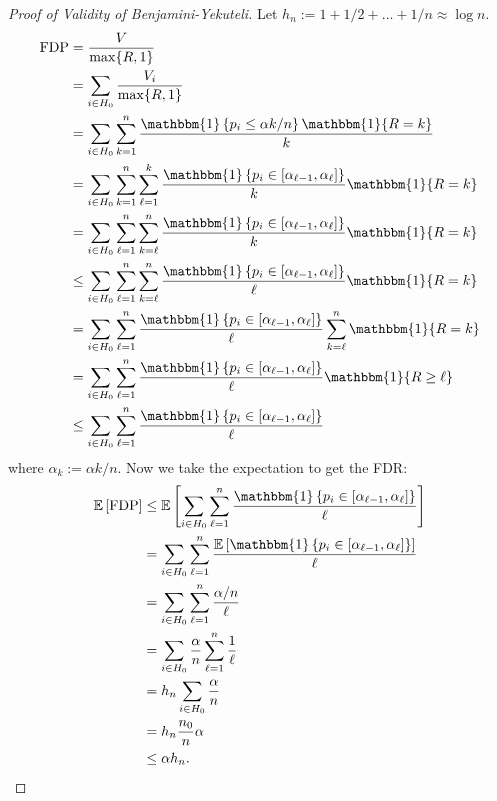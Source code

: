 \begin{proof}[Proof of Validity of Benjamini-Yekuteli]
Let \(h_n := 1 + 1/2 + \ldots + 1/n \approx \log n\).
\begin{align*}
\operatorname{FDP} & = \frac{V}{\max \{R, 1\}} 
\\ & = \sum_{i \in H_0} \frac{V_i}{\max \{R, 1\}} 
\\ & = \sum_{i \in H_0}  \sum_{k=1}^n \frac{\mathbbm{1} \left\{ p_i \leq \alpha k/n \right\}  \mathbbm{1}\{R = k\}}{k} 
\\ & = \sum_{i \in H_0}  \sum_{k=1}^n \sum_{\ell =1 }^k \frac{\mathbbm{1} \left\{ p_i \in [\alpha_{\ell - 1}, \alpha_\ell] \right\} }{k}  \mathbbm{1}\{R = k\}
\\ & = \sum_{i \in H_0}  \sum_{\ell =1 }^n \sum_{k=\ell}^n \frac{\mathbbm{1} \left\{ p_i \in [\alpha_{\ell - 1}, \alpha_\ell] \right\} }{k}  \mathbbm{1}\{R = k\}
\\ & \leq \sum_{i \in H_0}  \sum_{\ell =1 }^n \sum_{k=\ell}^n \frac{\mathbbm{1} \left\{ p_i \in [\alpha_{\ell - 1}, \alpha_\ell] \right\} }{\ell}  \mathbbm{1}\{R = k\}
\\ & = \sum_{i \in H_0}  \sum_{\ell =1 }^n  \frac{\mathbbm{1} \left\{ p_i \in [\alpha_{\ell - 1}, \alpha_\ell] \right\} }{\ell}  \sum_{k=\ell}^n \mathbbm{1}\{R = k\}
\\ & = \sum_{i \in H_0}  \sum_{\ell =1 }^n  \frac{\mathbbm{1} \left\{ p_i \in [\alpha_{\ell - 1}, \alpha_\ell] \right\} }{\ell}  \mathbbm{1}\{R \geq \ell \}
\\ & \leq  \sum_{i \in H_0}  \sum_{\ell =1 }^n  \frac{\mathbbm{1} \left\{ p_i \in [\alpha_{\ell - 1}, \alpha_\ell] \right\} }{\ell} 
\end{align*}
where \(\alpha_k := \alpha k/n\). Now we take the expectation to get the FDR:
\begin{align*}
\E \left[ \operatorname{FDP}\right] & \leq  \E \left[  \sum_{i \in H_0}  \sum_{\ell =1 }^n  \frac{\mathbbm{1} \left\{ p_i \in [\alpha_{\ell - 1}, \alpha_\ell] \right\} }{\ell} \right]
\\ & =\sum_{i \in H_0}  \sum_{\ell =1 }^n   \frac{ \E \left[ \mathbbm{1} \left\{ p_i \in [\alpha_{\ell - 1}, \alpha_\ell] \right\}  \right]}{\ell}
\\ & = \sum_{i \in H_0}  \sum_{\ell =1 }^n   \frac{ \alpha/n}{\ell}
\\ & = \sum_{i \in H_0} \frac{\alpha}{n}  \sum_{\ell =1 }^n   \frac{ 1}{\ell}
\\ & =   h_n \sum_{i \in H_0} \frac{\alpha}{n}  
\\ & =   h_n \frac{n_0}{n}  \alpha
\\ & \leq \alpha h_n.
\end{align*}



\end{proof}

